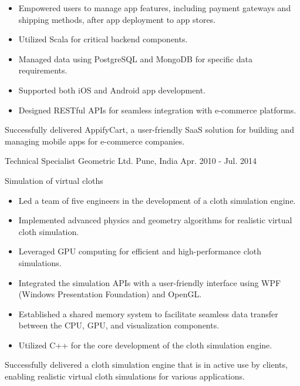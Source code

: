 \begin{cventries}
{\begin{cvitems}
\begin{itemize}
          \item Empowered users to manage app features, including payment gateways and shipping methods, after app deployment to app stores.
          \item Utilized Scala for critical backend components.
          \item Managed data using PostgreSQL and MongoDB for specific data requirements.
          \item Supported both iOS and Android app development.
          \item Designed RESTful APIs for seamless integration with e-commerce platforms.
          \end{itemize}
        Successfully delivered AppifyCart, a user-friendly SaaS solution for building and managing mobile apps for e-commerce companies.
      \end{cvitems}
    }

  \cventry
    {Technical Specialist} %
    {Geometric Ltd.} %
    {Pune, India} %
    {Apr. 2010 - Jul. 2014} %
    {
      \begin{cvitems} %
        \item{Simulation of virtual cloths}
        \begin{itemize}
        \item Led a team of five engineers in the development of a cloth simulation engine.
        \item Implemented advanced physics and geometry algorithms for realistic virtual cloth simulation.
        \item Leveraged GPU computing for efficient and high-performance cloth simulations.
        \item Integrated the simulation APIs with a user-friendly interface using WPF (Windows Presentation Foundation) and OpenGL.
        \item Established a shared memory system to facilitate seamless data transfer between the CPU, GPU, and visualization components.
        \item Utilized C++ for the core development of the cloth simulation engine.
        \end{itemize}
        Successfully delivered a cloth simulation engine that is in active use by clients, enabling realistic virtual cloth simulations for various applications.
      \end{cvitems}
    }


\end{cventries}
